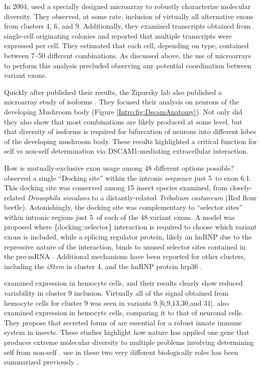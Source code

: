     In 2004, \citet{Neves2004} used a specially designed microarray to robustly characterize \dscam{} molecular diversity. They observed, at some rate, inclusion of virtually all alternative exons from clusters 4, 6, and 9. Additionally, they examined \dscam{} transcripts obtained from single-cell originating colonies and reported that multiple \dscam{} transcripts were expressed per cell. They estimated that each cell, depending on type, contained between 7--50 different combinations. As discussed above, the use of microarrays to perform this analysis precluded observing any potential coordination between variant exons.

    Quickly after \citet{Neves2004} published their results, the Zipursky lab also published a microarray study of \dscam{} isoforms \citep{Zhan2004}. They focused their analysis on neurons of the developing Mushroom body (Figure \ref{Intro:fig:DscamAnatomy}). Not only did they also show that most \dscam{} combinations are likely produced at some level, but that diversity of isoforms is required for bifurcation of neurons into different lobes of the developing mushroom body. These results highlighted a critical function for self vs non-self determination via DSCAM1-mediating extracellular interaction.

    How is mutually-exclusive exon usage among 48 different options possible? \citet{Graveley2005b} observed a single ``Docking site'' within the intronic sequence just 5\textprime~to exon 6.1. This docking site was conserved among 15 insect species examined, from closely-related \textit{Drosophila simulans} to a distantly-related \textit{Tribolium castaneum} (Red flour beetle). Astonishingly, the docking site was complementary to ``selector sites'' within intronic regions just 5\textprime~of each of the 48 variant exons. A model was proposed where \{docking::selector\} interaction is required to choose which variant exons is included, while a splicing regulator protein, likely an hnRNP due to the repressive nature of the interaction, binds to unused selector sites contained in the pre-mRNA \citep{Graveley2000}. Additional mechanisms have been reported for other clusters, including the \textit{iStem} \citep{Kreahling2005} in cluster 4, and the hnRNP protein hrp36 \citep{Olson2007}.

    \citep{Neves2004} examined \dscam{} expression in hemocyte cells, and their results clearly show reduced variability in cluster 9 inclusion. Virtually all of the signal obtained from hemocyte cells for cluster 9 was seen in variants 9.[6,9,13,30,and 31]. \citep{Watson2005} also examined \dscam{} expression in hemocyte cells, comparing it to that of neuronal cells. They propose that secreted forms of \dscam{} are essential for a robust innate immune system in insects. These studies highlight how nature has applied one gene that produces extreme molecular diversity to multiple problems involving determining self from non-self \citep{Shi2012a, Hattori2008}. \dscam{} use in these two very different biologically roles has been summarized previously \citep{Hemani2012}.

